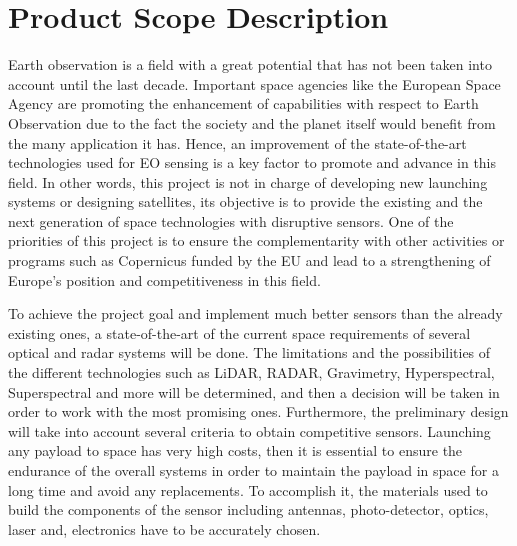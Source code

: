 \section{Product Scope Description}

Earth observation is a field with a great potential that has not been taken into account until the last decade. Important space agencies like the European Space Agency are promoting the enhancement of capabilities with respect to Earth Observation due to the fact the society and the planet itself would benefit from the many application it has. Hence, an improvement of the state-of-the-art technologies used for EO sensing is a key factor to promote and advance in this field. In other words, this project is not in charge of developing new launching systems or designing satellites, its objective is to provide the existing and the next generation of space technologies with disruptive sensors. One of the priorities of this project is to ensure the complementarity with other activities or programs such as Copernicus funded by the EU and lead to a strengthening of Europe's position and competitiveness in this field.

To achieve the project goal and implement much better sensors than the already existing ones, a state-of-the-art of the current space requirements of several optical and radar systems will be done. The limitations and the possibilities of the different technologies such as LiDAR, RADAR, Gravimetry, Hyperspectral, Superspectral and more will be determined, and then a decision will be taken in order to work with the most promising ones. Furthermore, the preliminary design will take into account several criteria to obtain competitive sensors. Launching any payload to space has very high costs, then it is essential to ensure the endurance of the overall systems in order to maintain the payload in space for a long time and avoid any replacements. To accomplish it, the materials used to build the components of the sensor including antennas, photo-detector, optics, laser and, electronics have to be accurately chosen.


